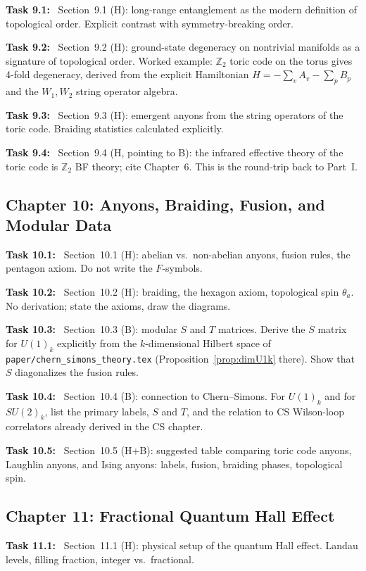 \documentclass[11pt]{article}
\newcommand{\task}[1]{\medskip\noindent\textbf{Task #1:}\ }
\begin{document}
\task{9.1} Section~9.1 (H): long-range entanglement as the modern definition of
topological order. Explicit contrast with symmetry-breaking order.

\task{9.2} Section~9.2 (H): ground-state degeneracy on nontrivial manifolds as a
signature of topological order. Worked example: $\mathbb{Z}_2$ toric code on the torus
gives 4-fold degeneracy, derived from the explicit Hamiltonian
$H = -\sum_v A_v - \sum_p B_p$ and the $W_1, W_2$ string operator algebra.

\task{9.3} Section~9.3 (H): emergent anyons from the string operators of the toric
code. Braiding statistics calculated explicitly.

\task{9.4} Section~9.4 (H, pointing to B): the infrared effective theory of the toric
code is $\mathbb{Z}_2$ BF theory; cite Chapter~6. This is the round-trip back to Part~I.

\subsection{Chapter 10: Anyons, Braiding, Fusion, and Modular Data}

\task{10.1} Section~10.1 (H): abelian vs.\ non-abelian anyons, fusion rules, the
pentagon axiom. Do not write the $F$-symbols.

\task{10.2} Section~10.2 (H): braiding, the hexagon axiom, topological spin $\theta_a$.
No derivation; state the axioms, draw the diagrams.

\task{10.3} Section~10.3 (B): modular $S$ and $T$ matrices. Derive the $S$ matrix for
$U(1)_k$ explicitly from the $k$-dimensional Hilbert space of
\texttt{paper/chern\_simons\_theory.tex} (Proposition~\ref{prop:dimU1k} there).
Show that $S$ diagonalizes the fusion rules.

\task{10.4} Section~10.4 (B): connection to Chern--Simons. For $U(1)_k$ and for
$SU(2)_k$, list the primary labels, $S$ and $T$, and the relation to CS Wilson-loop
correlators already derived in the CS chapter.

\task{10.5} Section~10.5 (H+B): suggested table comparing toric code anyons, Laughlin
anyons, and Ising anyons: labels, fusion, braiding phases, topological spin.

\subsection{Chapter 11: Fractional Quantum Hall Effect}

\task{11.1} Section~11.1 (H): physical setup of the quantum Hall effect. Landau levels,
filling fraction, integer vs.\ fractional.
\end{document}
